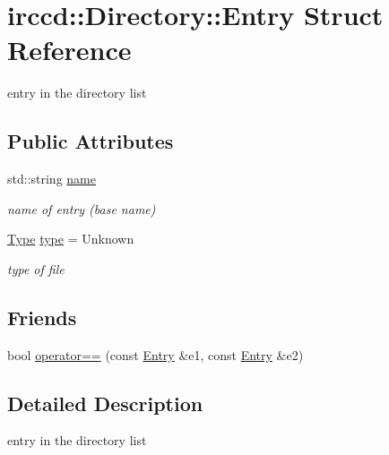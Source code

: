 \hypertarget{a00026}{\section{irccd\-:\-:Directory\-:\-:Entry Struct Reference}
\label{a00026}
}


entry in the directory list  


\subsection*{Public Attributes}
\begin{DoxyCompactItemize}
\item 
\hypertarget{a00026_a494a59183c834657c4cd579d4788af46}{std\-::string \hyperlink{a00026_a494a59183c834657c4cd579d4788af46}{name}}\label{a00026_a494a59183c834657c4cd579d4788af46}

\begin{DoxyCompactList}\small\item\em name of entry (base name) \end{DoxyCompactList}\item 
\hypertarget{a00026_ac7c470837cc9382d470c0bd45c6e9658}{\hyperlink{a00025_a12a53ee04d1d0de47e3ec9addf66d209}{Type} \hyperlink{a00026_ac7c470837cc9382d470c0bd45c6e9658}{type} = Unknown}\label{a00026_ac7c470837cc9382d470c0bd45c6e9658}

\begin{DoxyCompactList}\small\item\em type of file \end{DoxyCompactList}\end{DoxyCompactItemize}
\subsection*{Friends}
\begin{DoxyCompactItemize}
\item 
bool \hyperlink{a00026_a740303ab2d412c71c0216c20ba2049ee}{operator==} (const \hyperlink{a00026}{Entry} \&e1, const \hyperlink{a00026}{Entry} \&e2)
\end{DoxyCompactItemize}


\subsection{Detailed Description}
entry in the directory list 

